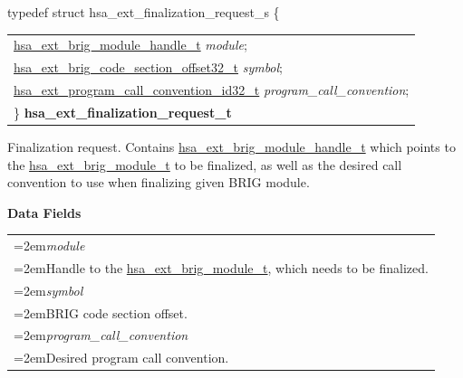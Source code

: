 \documentclass[final]{book}
\newcommand{\reffld}[1]{\textit{#1}}
\begin{document}
\noindent\begin{tcolorbox}[breakable,nobeforeafter,arc=0mm,colframe=white,colback=lightgray,left=0mm]
typedef struct  hsa_ext_finalization_request_s \{
\vspace{-3.5mm}\begin{longtable}{@{}p{\textwidth}}
\hspace{1.7em}\hyperlink{group__FinalizerCoreApi_1ga0216996f5341a8591ecf9e0f6fd1b7e5}{hsa_ext_brig_module_handle_t} \reffld{module};\\
\hspace{1.7em}\hyperlink{group__FinalizerCoreApi_1ga494b8ac14a8c10af95b83b51a8a4ad7f}{hsa_ext_brig_code_section_offset32_t} \reffld{symbol};\\
\hspace{1.7em}\hyperlink{group__FinalizerCoreApi_1gad4afadfa0983f1bc637f3add3a006cba}{hsa_ext_program_call_convention_id32_t} \reffld{program_call_convention};\\
\}  \hypertarget{group__FinalizerCoreApi_1ga670c94fee80740017464110a40775b33}{\textbf{hsa_ext_finalization_request_t}}
\end{longtable}

\end{tcolorbox}
Finalization request. Contains \hyperlink{group__FinalizerCoreApi_1ga0216996f5341a8591ecf9e0f6fd1b7e5}{hsa_ext_brig_module_handle_t} which points to the \hyperlink{group__FinalizerCoreApi_1ga104477d24306200a2847b44c325e312a}{hsa_ext_brig_module_t} to be finalized, as well as the desired call convention to use when finalizing given BRIG module.

\noindent\textbf{Data Fields}\\[-6mm]
\begin{longtable}{@{}>{\hangindent=2em}p{\textwidth}}
\reffld{module}\\\hspace{2em}Handle to the \hyperlink{group__FinalizerCoreApi_1ga104477d24306200a2847b44c325e312a}{hsa_ext_brig_module_t}, which needs to be finalized.\\[2mm]
\reffld{symbol}\\\hspace{2em}BRIG code section offset.\\[2mm]
\reffld{program_call_convention}\\\hspace{2em}Desired program call convention.
\end{longtable}
\end{document}
